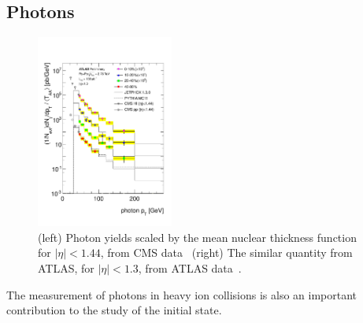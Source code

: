 \subsection{Photons}

\begin{figure}[!ht]
\begin{center}
\includegraphics[width=0.40\textwidth]{electroweak_figs/ph_fig_11.pdf}
\caption[]{(left) Photon yields scaled by the mean nuclear thickness function for $|\eta|<1.44$, from CMS data~\cite{Chatrchyan:2012vq} (right) The similar quantity from ATLAS, for $|\eta|<1.3$, from ATLAS data~\cite{ATLAS:2012zla}.}
\label{fig:pas:photon}
\end{center}
\end{figure}

The measurement of photons in heavy ion collisions is also an important contribution to the
study of the \PbPb initial state.

